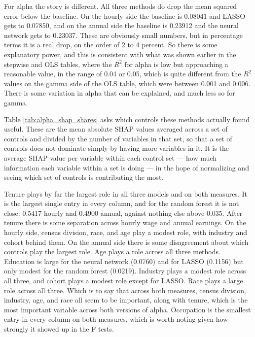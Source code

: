 \documentclass[12pt]{article}
\begin{document}
\begin{onehalfspace}
For alpha the story is different. All three methods do drop the mean squared error below the baseline. On the hourly side the baseline is 0.08041 and LASSO gets to 0.07850, and on the annual side the baseline is 0.23912 and the neural network gets to 0.23037. These are obviously small numbers, but in percentage terms it is a real drop, on the order of 2 to 4 percent. So there is some explanatory power, and this is consistent with what was shown earlier in the stepwise and OLS tables, where the $R^2$ for alpha is low but approaching a reasonable value, in the range of 0.04 or 0.05, which is quite different from the $R^2$ values on the gamma side of the OLS table, which were between 0.001 and 0.006. There is some variation in alpha that can be explained, and much less so for gamma.

Table \ref{tab:alpha_shap_shares} asks which controls these methods actually found useful. These are the mean absolute SHAP values averaged across a set of controls and divided by the number of variables in that set, so that a set of controls does not dominate simply by having more variables in it. It is the average SHAP value per variable within each control set --- how much information each variable within a set is doing --- in the hope of normalizing and seeing which set of controls is contributing the most.

\begin{table}[H]
    \centering
    \caption{Group SHAP Shares of Controls, Alpha (Average |SHAP| per Variable x 100)}
    \label{tab:alpha_shap_shares}
    
\end{table}


Tenure plays by far the largest role in all three models and on both measures. It is the largest single entry in every column, and for the random forest it is not close: 0.5417 hourly and 0.4900 annual, against nothing else above 0.035. After tenure there is some separation across hourly wage and annual earnings. On the hourly side, census division, race, and age play a modest role, with industry and cohort behind them. On the annual side there is some disagreement about which controls play the largest role. Age plays a role across all three methods. Education is large for the neural network (0.0760) and for LASSO (0.1156) but only modest for the random forest (0.0219). Industry plays a modest role across all three, and cohort plays a modest role except for LASSO. Race plays a large role across all three. Which is to say that across both measures, census division, industry, age, and race all seem to be important, along with tenure, which is the most important variable across both versions of alpha. Occupation is the smallest entry in every column on both measures, which is worth noting given how strongly it showed up in the F tests.



\end{onehalfspace}
\end{document}
